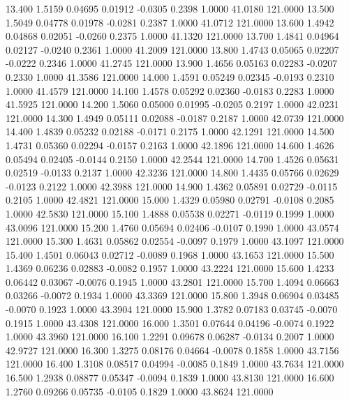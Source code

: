   13.400   1.5159   0.04695   0.01912  -0.0305   0.2398   1.0000  41.0180 121.0000
  13.500   1.5049   0.04778   0.01978  -0.0281   0.2387   1.0000  41.0712 121.0000
  13.600   1.4942   0.04868   0.02051  -0.0260   0.2375   1.0000  41.1320 121.0000
  13.700   1.4841   0.04964   0.02127  -0.0240   0.2361   1.0000  41.2009 121.0000
  13.800   1.4743   0.05065   0.02207  -0.0222   0.2346   1.0000  41.2745 121.0000
  13.900   1.4656   0.05163   0.02283  -0.0207   0.2330   1.0000  41.3586 121.0000
  14.000   1.4591   0.05249   0.02345  -0.0193   0.2310   1.0000  41.4579 121.0000
  14.100   1.4578   0.05292   0.02360  -0.0183   0.2283   1.0000  41.5925 121.0000
  14.200   1.5060   0.05000   0.01995  -0.0205   0.2197   1.0000  42.0231 121.0000
  14.300   1.4949   0.05111   0.02088  -0.0187   0.2187   1.0000  42.0739 121.0000
  14.400   1.4839   0.05232   0.02188  -0.0171   0.2175   1.0000  42.1291 121.0000
  14.500   1.4731   0.05360   0.02294  -0.0157   0.2163   1.0000  42.1896 121.0000
  14.600   1.4626   0.05494   0.02405  -0.0144   0.2150   1.0000  42.2544 121.0000
  14.700   1.4526   0.05631   0.02519  -0.0133   0.2137   1.0000  42.3236 121.0000
  14.800   1.4435   0.05766   0.02629  -0.0123   0.2122   1.0000  42.3988 121.0000
  14.900   1.4362   0.05891   0.02729  -0.0115   0.2105   1.0000  42.4821 121.0000
  15.000   1.4329   0.05980   0.02791  -0.0108   0.2085   1.0000  42.5830 121.0000
  15.100   1.4888   0.05538   0.02271  -0.0119   0.1999   1.0000  43.0096 121.0000
  15.200   1.4760   0.05694   0.02406  -0.0107   0.1990   1.0000  43.0574 121.0000
  15.300   1.4631   0.05862   0.02554  -0.0097   0.1979   1.0000  43.1097 121.0000
  15.400   1.4501   0.06043   0.02712  -0.0089   0.1968   1.0000  43.1653 121.0000
  15.500   1.4369   0.06236   0.02883  -0.0082   0.1957   1.0000  43.2224 121.0000
  15.600   1.4233   0.06442   0.03067  -0.0076   0.1945   1.0000  43.2801 121.0000
  15.700   1.4094   0.06663   0.03266  -0.0072   0.1934   1.0000  43.3369 121.0000
  15.800   1.3948   0.06904   0.03485  -0.0070   0.1923   1.0000  43.3904 121.0000
  15.900   1.3782   0.07183   0.03745  -0.0070   0.1915   1.0000  43.4308 121.0000
  16.000   1.3501   0.07644   0.04196  -0.0074   0.1922   1.0000  43.3960 121.0000
  16.100   1.2291   0.09678   0.06287  -0.0134   0.2007   1.0000  42.9727 121.0000
  16.300   1.3275   0.08176   0.04664  -0.0078   0.1858   1.0000  43.7156 121.0000
  16.400   1.3108   0.08517   0.04994  -0.0085   0.1849   1.0000  43.7634 121.0000
  16.500   1.2938   0.08877   0.05347  -0.0094   0.1839   1.0000  43.8130 121.0000
  16.600   1.2760   0.09266   0.05735  -0.0105   0.1829   1.0000  43.8624 121.0000
